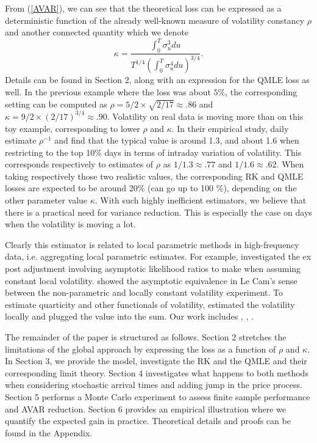 \documentclass[11pt]{article}
\numberwithin{equation}{section}
\theoremstyle{plain}
\theoremstyle{remark}
\begin{document}
\smallskip
From (\ref{AVAR}), we can see that the theoretical loss can be expressed as a deterministic function of the already well-known measure of volatility constancy $\rho$ and another connected quantity which we denote $$\kappa = \frac{\int_0^T \sigma_u^3 du}{
T^{1/4}(\int_0^T \sigma_u^4 du)^{3/4}}.$$
Details can be found in Section 2, along with an expression for the QMLE loss as well. In the previous example where the loss was about $5 \%$, the corresponding setting can be computed as $\rho = 5/2 \times \sqrt{2/17} \approx .86$ and $\kappa = 9/2 \times (2/17)^{3/4} \approx .90$. Volatility on real data is moving more than on this toy example, corresponding to lower $\rho$ and $\kappa$. In their empirical study, \cite{andersen2014robust} daily estimate $\rho^{-1}$ and find that the typical value is around 1.3, and about 1.6 when restricting to the top 10\% days in terms of intraday variation of volatility. This corresponds respectively to estimates of $\rho$ as $1/1.3 \approx .77$ and $1/1.6 \approx .62$. When taking respectively those two realistic values, the corresponding RK and QMLE losses are expected to be around 20\% (can go up to 100 \%), depending on the other parameter value $\kappa$. With such highly inefficient estimators, we believe that there is a practical need for variance reduction. This is especially the case on days when the volatility is moving a lot.

\smallskip
Clearly this estimator is related to local parametric methods in high-frequency data, i.e. aggregating local parametric estimates. For example, \cite{mykland2009inference} investigated the ex post adjustment involving asymptotic likelihood
ratios to make when assuming constant local volatility. \cite{reiss2011asymptotic} showed the asymptotic equivalence in Le Cam's sense between the non-parametric and locally constant volatility experiment. To estimate quarticity and other functionals of volatility, \cite{jacod2013quarticity} estimated the volatility locally and plugged the value into the sum. Our work includes \cite{potiron2017estimation}, \cite{potiron2016local}, \cite{clinet2018statistical}.

\smallskip
The remainder of the paper is structured as follows. Section 2 stretches the limitations of the global approach by expressing the loss as a function of $\rho$ and $\kappa$. In Section 3, we provide the model, investigate the RK and the QMLE and their corresponding limit theory. Section 4 investigates what happens to both methods when considering stochastic arrival times and adding jump in the price process. Section 5 performs a Monte Carlo experiment to assess finite sample performance and AVAR reduction. Section 6 provides an empirical illustration where we quantify the expected gain in practice. Theoretical details and proofs can be found in the Appendix.
\end{document}
